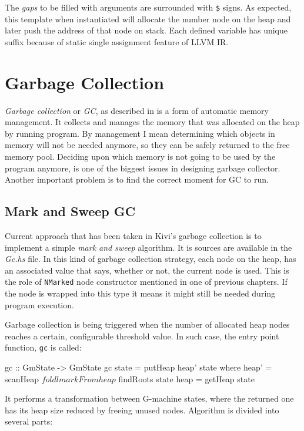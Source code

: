 \documentclass[12pt,a4paper]{report}
\begin{document}
The \textit{gaps} to be filled with arguments are surrounded with \texttt{\$}
signs. As expected, this template when instantiated will allocate the number
node on the heap and later push the address of that node on stack. Each defined
variable has unique suffix because of static single assignment feature of LLVM
IR.


\section{Garbage Collection}
\label{sec:garbage_collection}
\textit{Garbage collection} or \textit{GC}, as described in
\cite{wiki:garbage_collection} is a form of automatic memory management. It
collects and manages the memory that was allocated on the heap by running
program. By management I mean determining which objects in memory will not be
needed anymore, so they can be safely returned to the free memory pool.
Deciding upon which memory is not going to be used by the program anymore, is
one of the biggest issues in designing garbage collector. Another important
problem is to find the correct moment for GC to run.

\subsection{Mark and Sweep GC}
Current approach that has been taken in Kivi's garbage collection is to
implement a simple \textit{mark and sweep} algorithm. It is sources are
available in the \textit{Gc.hs} file. In this kind of garbage collection
strategy, each node on the heap, has an associated value that says, whether or
not, the current node is used. This is the role of \texttt{NMarked} node
constructor mentioned in one of previous chapters. If the node is wrapped into
this type it means it might still be needed during program execution.

Garbage collection is being triggered when the number of allocated heap nodes
reaches a certain, configurable threshold value. In such case, the entry point
function, \texttt{gc} is called:

\vspace*{0.2in}

\begin{code}[style=haskell]
  gc :: GmState -> GmState
  gc state = putHeap heap' state
      where
          heap' = scanHeap $ foldl markFrom heap $ findRoots state
          heap = getHeap state
\end{code}

It performs a transformation between G-machine states, where the returned one
has its heap size reduced by freeing unused nodes. Algorithm is divided into
several parts:
\end{document}
